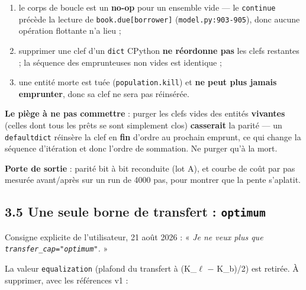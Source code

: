 \documentclass[11pt,a4paper]{article}
\newcommand{\code}[1]{\texttt{#1}}
\begin{document}
\begin{enumerate}
\item le corps de boucle est un \textbf{no-op} pour un ensemble vide --- le \code{continue} précède la lecture de \code{book.due[borrower]} (\code{model.py:903-905}), donc aucune opération flottante n'a lieu ;
\item supprimer une clef d'un \code{dict} CPython \textbf{ne réordonne pas} les clefs restantes ; la séquence des emprunteuses non vides est identique ;
\item une entité morte est tuée (\code{population.kill}) et \textbf{ne peut plus jamais emprunter}, donc sa clef ne sera pas réinsérée.
\end{enumerate}

\textbf{Le piège à ne pas commettre} : purger les clefs vides des entités \textbf{vivantes} (celles dont tous les prêts se sont simplement clos) \textbf{casserait} la parité --- un \code{defaultdict} réinsère la clef en \textbf{fin} d'ordre au prochain emprunt, ce qui change la séquence d'itération et donc l'ordre de sommation. Ne purger qu'à la mort.

\textbf{Porte de sortie} : parité bit à bit reconduite (lot A), et courbe de coût par pas mesurée avant/après sur un run de 4000 pas, pour montrer que la pente s'aplatit.

\subsection*{3.5 Une seule borne de transfert : \code{optimum}}

Consigne explicite de l'utilisateur, 21 août 2026 : « \emph{Je ne veux plus que \code{transfer\_cap="optimum"}.} »

La valeur \code{equalization} (plafond du transfert à (K\_\ensuremath{\ell} \ensuremath{-} K\_b)/2) est retirée. À supprimer, avec les références v1 :
\end{document}
